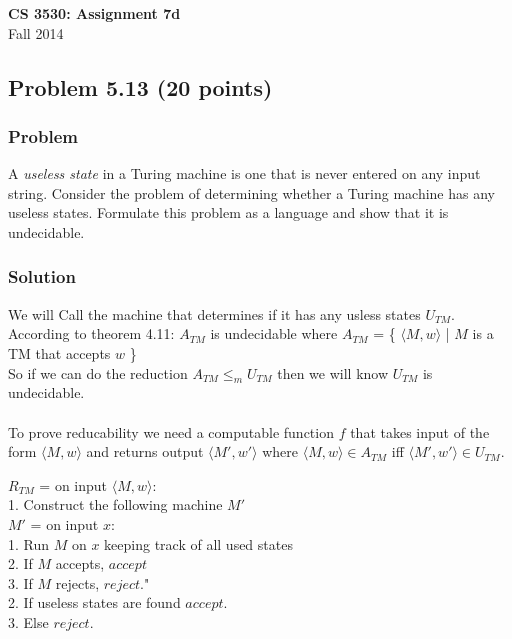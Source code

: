 \documentclass{article}
\begin{document}
\begin{center}
\textbf{\Large CS 3530: Assignment 7d} \\[2mm]
Fall 2014
\end{center}

\raggedright

\subsection*{Problem 5.13 (20 points)}

\subsubsection*{Problem}

A \textit{useless state} in a Turing machine is one that is never
entered on any input string. Consider the problem of determining
whether a Turing machine has any useless states. Formulate this
problem as a language and show that it is undecidable.

\subsubsection*{Solution}

We will Call the machine that determines if it has any usless states $U_{TM}$. \\

According to theorem 4.11: $A_{TM}$ is undecidable where $A_{TM}$ = \{ $\langle M, w\rangle$ | 
$M$ is a TM that accepts $w$ \} \\
So if we can do the reduction $A_{TM} \leq_{m} U_{TM}$ then we will know $U_{TM}$ is undecidable.\\ \ \\

To prove reducability we need a computable function $f$ that takes input of the form $\langle M, w\rangle$
and returns output $\langle M', w'\rangle$ where $\langle M, w\rangle \in A_{TM}$ iff
$\langle M', w'\rangle \in U_{TM}$.

$R_{TM}$ = on input $\langle M, w\rangle$: \\
\hspace{5 mm}	1. Construct the following machine $M'$ \\
\hspace{10 mm}		$M'$ = on input $x$: \\
\hspace{15 mm}			1. Run $M$ on $x$ keeping track of all used states\\
\hspace{15 mm}			2. If $M$ accepts, $accept$ \\
\hspace{15 mm}			3. If $M$ rejects, $reject$." \\
\hspace{5 mm}	2. If useless states are found $accept$. \\
\hspace{5 mm}	3. Else $reject$. \\
\end{document}
